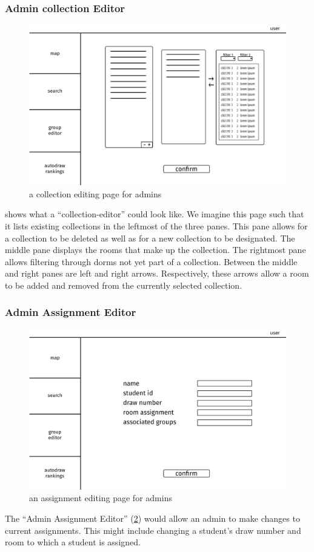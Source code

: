 \subsubsection{Admin collection Editor}
\begin{figure} \centering
\includegraphics[scale=.15]{wireframe/admin_suite_editor}
\caption{a collection editing page for admins}
\label{fig:wireadmin-collection-editor}
\end{figure}

 shows what a ``collection-editor'' could
look like. We imagine this page such that it lists existing collections in the
leftmost of the three panes. This pane allows for a collection to be deleted as
well as for a new collection to be designated. The middle pane displays the
rooms that make up the collection. The rightmost pane allows filtering through
dorms not yet part of a collection. Between the middle and right panes are left
and right arrows. Respectively, these arrows allow a room to be added and
removed from the currently selected collection.

\subsubsection{Admin Assignment Editor}
\begin{figure}[H] \centering
\includegraphics[scale=.15]{wireframe/admin_assignment_editor}
\caption{an assignment editing page for admins}
\label{fig:wireadmin-assignment-editor}
\end{figure}

The ``Admin Assignment Editor'' (\cref{fig:wireadmin-assignment-editor}) would
allow an admin to make changes to current assignments. This might include
changing a student's draw number and room to which a student is assigned.
